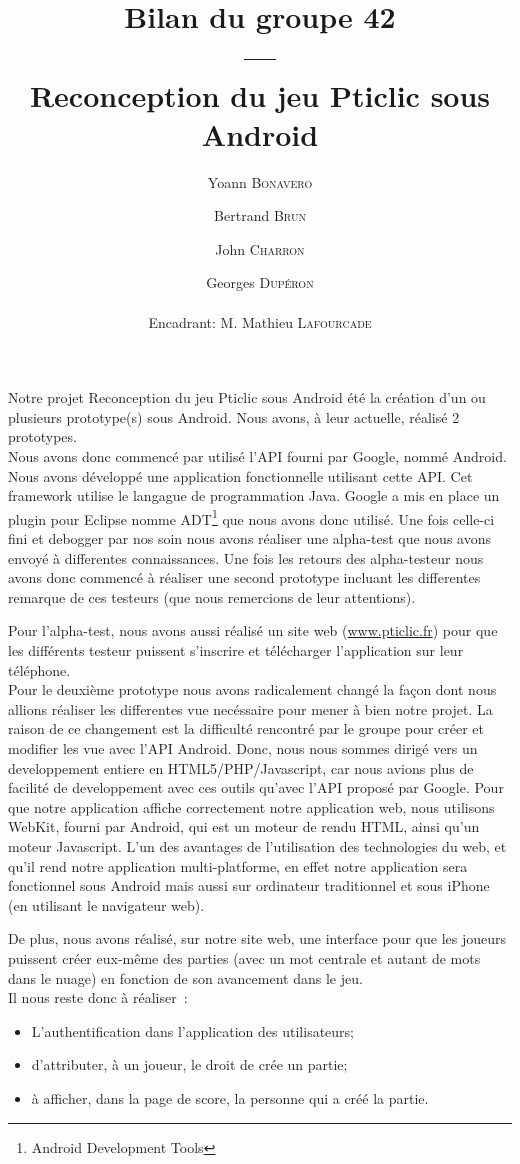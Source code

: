 \documentclass[a4paper,11pt,french]{article}
\title{Bilan du groupe 42\\---\\Reconception du jeu Pticlic sous Android}
\author{Yoann \textsc{Bonavero} \and Bertrand \textsc{Brun} \and John \textsc{Charron} \and Georges \textsc{Dupéron} \\\\ Encadrant: M. Mathieu \textsc{Lafourcade}}
\begin{document}
\maketitle

Notre projet \og{}Reconception du jeu Pticlic sous Android\fg{} été la création d'un ou plusieurs prototype(s) sous Android\texttrademark.
Nous avons, à leur actuelle, réalisé 2 prototypes.
\\

Nous avons donc commencé par utilisé l'API fourni par Google, nommé Android\texttrademark. Nous avons développé une application fonctionnelle utilisant cette API. Cet framework utilise le langague de programmation Java. Google a mis en place un plugin pour Eclipse nomme ADT\footnote{Android Development Tools} que nous avons donc utilisé. Une fois celle-ci fini et debogger par nos soin nous avons réaliser une alpha-test que nous avons envoyé à differentes connaissances. Une fois les retours des alpha-testeur nous avons donc commencé à réaliser une second prototype incluant les differentes remarque de ces testeurs (que nous remercions de leur attentions).

Pour l'alpha-test, nous avons aussi réalisé un site web (\url{www.pticlic.fr}) pour que les différents testeur puissent s'inscrire et télécharger l'application sur leur téléphone.
\\

Pour le deuxième prototype nous avons radicalement changé la façon dont nous allions réaliser les differentes vue necéssaire pour mener à bien notre projet. La raison de ce changement est la difficulté rencontré par le groupe pour créer et modifier les vue avec l'API Android\texttrademark. Donc, nous nous sommes dirigé vers un developpement entiere en HTML5/PHP/Javascript, car nous avions plus de facilité de developpement avec ces outils qu'avec l'API proposé par Google. Pour que notre application affiche correctement notre application web, nous utilisons WebKit, fourni par Android\texttrademark, qui est un moteur de rendu HTML, ainsi qu'un moteur Javascript. L'un des avantages de l'utilisation des technologies du web, et qu'il rend notre application multi-platforme, en effet notre application sera fonctionnel sous Android mais aussi sur ordinateur traditionnel et sous iPhone (en utilisant le navigateur web).

De plus, nous avons réalisé, sur notre site web, une interface pour que les joueurs puissent créer eux-même des parties (avec un mot centrale et autant de mots dans le nuage) en fonction de son avancement dans le jeu.
\\

\noindent Il nous reste donc à réaliser~:
\begin{itemize}
  \item L'authentification dans l'application des utilisateurs;
  \item d'attributer, à un joueur, le droit de crée un partie;
  \item à afficher, dans la page de score, la personne qui a créé la partie.
\end{itemize}
\end{document}
